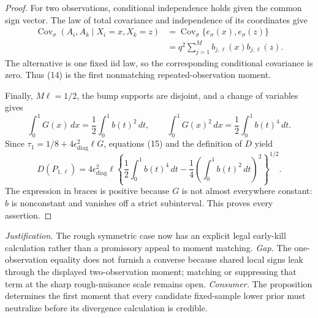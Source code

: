 \documentclass{article}
\begin{document}
\begin{proof}
For two observations, conditional independence holds given the common sign vector. The law of total covariance and independence of its coordinates give
\[
 \begin{aligned}
 \operatorname{Cov}_{\sigma}(A_i,A_k\mid X_i=x,X_k=z)
 &=\operatorname{Cov}_{\sigma}\{e_\sigma(x),e_\sigma(z)\}\\
 &=q^2\sum_{j=1}^M b_{j,\ell}(x)b_{j,\ell}(z).
 \end{aligned}                                                       \tag{14}
\]
The alternative is one fixed iid law, so the corresponding conditional covariance is zero. Thus (14) is the first nonmatching repeated-observation moment.

Finally, \(M\ell=1/2\), the bump supports are disjoint, and a change of variables gives
\[
 \int_0^1G(x)\,dx=\frac12\int_0^1b(t)^2\,dt,
 \qquad
 \int_0^1G(x)^2\,dx=\frac12\int_0^1b(t)^4\,dt.                       \tag{15}
\]
Since \(\tau_1=1/8+4\epsilon_{\mathrm{diag}}^2\ell G\), equations (15) and the definition of \(D\) yield
\[
 D(P_{1,\ell})
 =4\epsilon_{\mathrm{diag}}^2\ell
 \left\{\frac12\int_0^1b(t)^4\,dt
 -\frac14\left(\int_0^1b(t)^2\,dt\right)^2\right\}^{1/2}.            \tag{16}
\]
The expression in braces is positive because \(G\) is not almost everywhere constant: \(b\) is nonconstant and vanishes off a strict subinterval. This proves every assertion.
\end{proof}
\par\smallskip\noindent \textit{Justification.} The rough symmetric case now has an explicit legal early-kill calculation rather than a promissory appeal to moment matching. \textit{Gap.} The one-observation equality does not furnish a converse because shared local signs leak through the displayed two-observation moment; matching or suppressing that term at the sharp rough-nuisance scale remains open. \textit{Consumer.} The proposition determines the first moment that every candidate fixed-sample lower prior must neutralize before its divergence calculation is credible.
\end{document}
